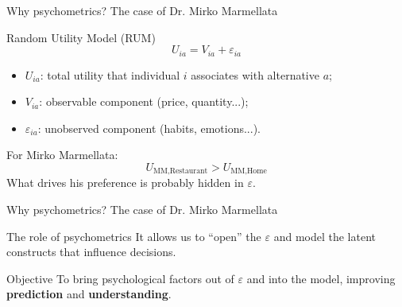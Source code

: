 \documentclass{beamer}
\begin{document}
\begin{frame}{Why psychometrics? The case of Dr. Mirko Marmellata}
\begin{block}{Random Utility Model (RUM)}
\[
U_{ia} = V_{ia} + \varepsilon_{ia}
\]
\begin{itemize}
  \item \(U_{ia}\): total utility that individual \(i\) associates with alternative \(a\);
  \item \(V_{ia}\): observable component (price, quantity...);
  \item \(\varepsilon_{ia}\): unobserved component (habits, emotions...).
\end{itemize}
\end{block}
\vspace{1em}
\begin{block}{For Mirko Marmellata:}
\[
U_{\text{MM}, \text{Restaurant}} > U_{\text{MM}, \text{Home}}
\]
What drives his preference is probably hidden in \(\varepsilon\).
\end{block}
\end{frame}

\begin{frame}{Why psychometrics? The case of Dr. Mirko Marmellata}
\begin{block}{The role of psychometrics}
It allows us to ``open'' the \(\varepsilon\) and model the latent constructs that influence decisions.
\end{block}
\vspace{1em}
\begin{block}{Objective}
To bring psychological factors out of \(\varepsilon\) and into the model, improving \textbf{prediction} and \textbf{understanding}.
\end{block}
\end{frame}
\end{document}
